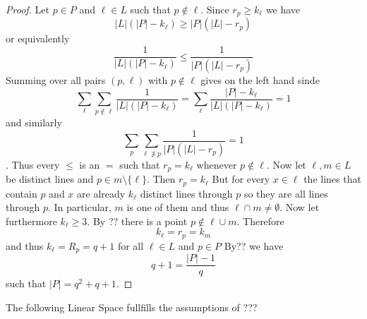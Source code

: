 \begin{proof}
Let \(p\in P\) and \(\ell\in L\) such that 
\(p\not\in\ell\).
Since \(r_p\geq k_\ell\) we have
\[|L|(|P|-k_\ell)\geq |P|(|L|-r_p)\] or equivalently
\[\dfrac{1}{|L|(|P|-k_\ell)}\leq \dfrac{1}{|P|(|L|-r_p)}\]  
Summing over all pairs \((p,\ell)\) with \(p\not\in \ell\) gives on the left hand sinde 
\[\sum_{\ell}\sum_{p\not\in\ell}\dfrac{1}{|L|(|P|-k_\ell)}=\sum_{\ell}\frac{|P|-k_\ell}{|L|(|P|-k_\ell)}=1\] 
and similarly \[\sum_{p}\sum_{\ell\not\ni p}\dfrac{1}{|P|(|L|-r_p)}=1\]. 
Thus every \(\leq\) is an \(=\) such that 
\(r_p=k_\ell\) whenever \(p\not\in\ell\).
Now let \(\ell,m\in L\) be distinct lines and 
\(p\in m\setminus\{\ell\}\).
Then \(r_p=k_\ell\)
But for every \(x\in \ell\) the lines that contain \(p\) and \(x\) are already 
\(k_\ell\) distinct lines through \(p\) so they are all lines through \(p\).
In particular, \(m\) is one of them and thus
\(\ell\cap m\neq \emptyset\).
        Now let furthermore \(k_\ell\geq 3\).
        By ?? there is a point \(p\not\in \ell\cup m\).
        Therefore \[k_\ell=r_p=k_m\] and thus 
        \(k_\ell=R_p=q+1\) for all \(\ell\in L\) and \(p\in P\)
        By?? we have 
        \[q+1=\frac{|P|-1}{q}\] such that \(|P|=q^2+q+1\).
\end{proof}
\begin{Bsp}
The following Linear Space fullfills the assumptions of ???

\begin{figure}[H]
    \centering
\end{figure}
\end{Bsp}
